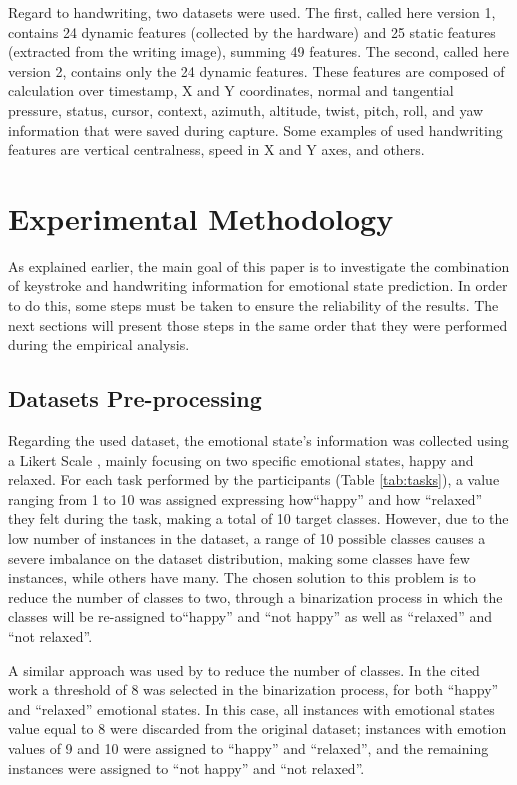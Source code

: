 \documentclass[conference]{IEEEtran}
\begin{document}

Regard to handwriting, two datasets were used. The first, called here version 1, contains 24 dynamic features (collected by the hardware) and 25 static features (extracted from the writing image), summing 49 features. The second, called here version 2, contains only the 24 dynamic features.
These features are composed of calculation over timestamp, X and Y coordinates, normal and tangential pressure, status, cursor, context, azimuth, altitude, twist, pitch, roll, and yaw information that were saved during capture. Some examples of used handwriting features are vertical centralness, speed in X and Y axes, and others.

\section{Experimental Methodology}

As explained earlier, the main goal of this paper is to investigate the combination of keystroke and handwriting information for emotional state prediction. In order to do this, some steps must be taken to ensure the reliability of the results. The next sections will present those steps in the same order that they were performed during the empirical analysis.


\subsection{Datasets Pre-processing}

Regarding the used dataset, the emotional state's information was collected using a Likert Scale \cite{likert}, mainly focusing on two specific emotional states, happy and relaxed. For each task performed by the participants (Table \ref{tab:tasks}), a value ranging from 1 to 10 was assigned expressing how``happy'' and how ``relaxed'' they felt during the task, making a total of 10 target classes. 
However, due to the low number of instances in the dataset, a range of 10 possible classes causes a severe imbalance on the dataset distribution, making some classes have few instances, while others have many. The chosen solution to this problem is to reduce the number of classes to two, through a binarization process in which the classes will be re-assigned to``happy'' and ``not happy'' as well as ``relaxed'' and ``not relaxed''. 

A similar approach was used by \cite{cheng-thesis} to reduce the number of classes. In the cited work a threshold of 8 was selected in the binarization process, for both ``happy'' and ``relaxed'' emotional states. In this case, all instances with emotional states value equal to 8 were discarded from the original dataset; instances with emotion values of 9 and 10 were assigned to ``happy'' and ``relaxed'', and the remaining instances were assigned to ``not happy'' and ``not relaxed''.
\end{document}
